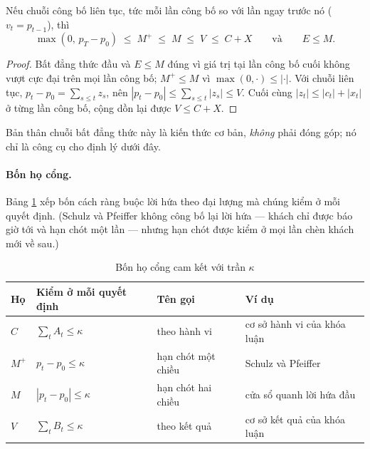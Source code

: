 \begin{menhde}
\label{md:chuoi}
Nếu chuỗi công bố liên tục, tức mỗi lần công bố so với lần ngay trước nó ($v_t = p_{t-1}$), thì
\[
\max(0,\, p_T - p_0) \;\le\; M^{+} \;\le\; M \;\le\; V \;\le\; C + X
\qquad\text{và}\qquad E \le M .
\]
\end{menhde}

\begin{proof}
Bất đẳng thức đầu và $E \le M$ đúng vì giá trị tại lần công bố cuối không vượt cực đại trên mọi
lần công bố; $M^{+} \le M$ vì $\max(0,\cdot) \le |\cdot|$. Với chuỗi liên tục,
$p_t - p_0 = \sum_{s \le t} z_s$, nên $|p_t - p_0| \le \sum_{s \le t} |z_s| \le V$. Cuối cùng
$|z_t| \le |c_t| + |x_t|$ ở từng lần công bố, cộng dồn lại được $V \le C + X$.
\end{proof}

Bản thân chuỗi bất đẳng thức này là kiến thức cơ bản, \emph{không} phải đóng góp; nó chỉ là công
cụ cho định lý dưới đây.

\paragraph{Bốn họ cổng.} Bảng \ref{bang:hocong} xếp bốn cách ràng buộc lời hứa theo đại lượng mà
chúng kiểm ở mỗi quyết định. (Schulz và Pfeiffer không công bố lại lời hứa --- khách chỉ được báo
giờ tới và hạn chót một lần --- nhưng hạn chót được kiểm ở mọi lần chèn khách mới về sau.)

\begin{table}[htbp]
\centering
\caption{Bốn họ cổng cam kết với trần $\kappa$}
\label{bang:hocong}
\small
\begin{tabular}{@{}llll@{}}
\toprule
\textbf{Họ} & \textbf{Kiểm ở mỗi quyết định} & \textbf{Tên gọi} & \textbf{Ví dụ}\\
\midrule
$C$ & $\sum_t A_t \le \kappa$ & theo hành vi & cơ sở hành vi của khóa luận\\
$M^{+}$ & $p_t - p_0 \le \kappa$ & hạn chót một chiều & Schulz và Pfeiffer \cite{schulz2026}\\
$M$ & $|p_t - p_0| \le \kappa$ & hạn chót hai chiều & cửa sổ quanh lời hứa đầu\\
$V$ & $\sum_t B_t \le \kappa$ & theo kết quả & cơ sở kết quả của khóa luận\\
\bottomrule
\end{tabular}
\end{table}

